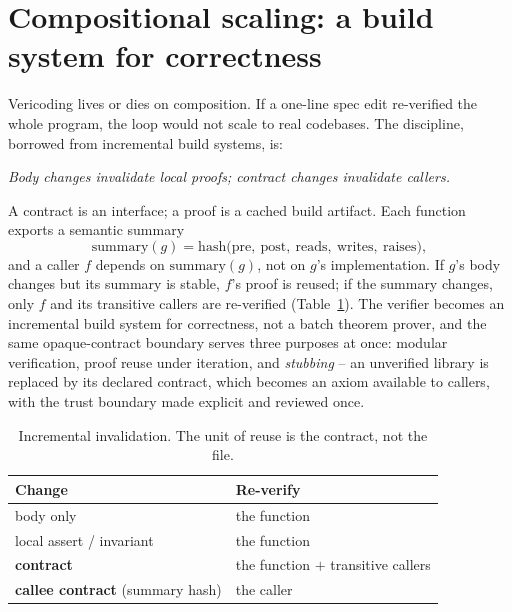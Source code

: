 \documentclass[sigconf,nonacm]{acmart}
\begin{document}
\section{Compositional scaling: a build system for correctness}
\label{sec:compose}

Vericoding lives or dies on composition. If a one-line spec edit re-verified the
whole program, the loop would not scale to real codebases. The discipline,
borrowed from incremental build systems, is:
\begin{center}
\emph{Body changes invalidate local proofs; contract changes invalidate callers.}
\end{center}

A contract is an interface; a proof is a cached build artifact. Each function
exports a semantic summary
\[
\mathrm{summary}(g) = \mathrm{hash}\big(\text{pre},\ \text{post},\ \text{reads},\ \text{writes},\ \text{raises}\big),
\]
and a caller $f$ depends on $\mathrm{summary}(g)$, not on $g$'s implementation. If
$g$'s body changes but its summary is stable, $f$'s proof is reused; if the
summary changes, only $f$ and its transitive callers are re-verified
(Table~\ref{tab:incremental}). The verifier becomes an incremental build system
for correctness, not a batch theorem prover, and the same opaque-contract
boundary serves three purposes at once: modular verification, proof reuse under
iteration, and \emph{stubbing} -- an unverified library is replaced by its
declared contract, which becomes an axiom available to callers, with the trust
boundary made explicit and reviewed once.

\begin{table}[t]
\caption{Incremental invalidation. The unit of reuse is the contract, not the
file.}
\label{tab:incremental}
\small
\begin{tabular}{@{}ll@{}}
\toprule
Change & Re-verify \\
\midrule
body only & the function \\
local assert / invariant & the function \\
\textbf{contract} & the function $+$ transitive callers \\
\textbf{callee contract} (summary hash) & the caller \\
\bottomrule
\end{tabular}
\end{table}
\end{document}

